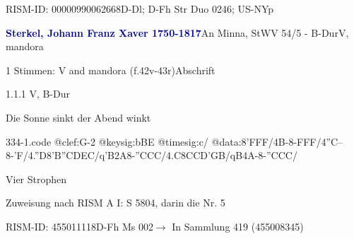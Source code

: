 \documentclass[twocolumn, 12pt]{book}
\begin{document}
\par RISM-ID: 00000990062668\newline D-Dl; D-Fh  Str Duo 0246; US-NYp
\par \vspace{16pt} \textcolor{darkblue}{\textbf{Sterkel, Johann Franz Xaver  1750-1817}}\hfillplus{\textbf{[334]}}\newline An Minna, StWV 54/5 - B-Dur\newline V, mandora
\par \begin{itshape}\end{itshape} 
\par \textcolor{darkblue}{}  1 Stimmen: V and mandora  (f.42v-43r)\newline Abschrift
\par 1.1.1  V, B-Dur\newline \begin{footnotesize} Die Sonne sinkt der Abend winkt \end{footnotesize}  
\begin{filecontents*}{334-1.code}
@clef:G-2
@keysig:bBE
@timesig:c/
@data:8'FFF/4B-8-FFF/4''C--8-'F/4.''D8'B{''CD}{EC}/q'B2A8-''CCC/4.C8C{CD}{'GB}/qB4A-8-''CCC/
\end{filecontents*}
\newline %
\par Vier Strophen
\par Zuweisung nach RISM A I: S 5804, darin die Nr. 5
\par RISM-ID: 455011118\newline D-Fh  Ms 002\newline $\rightarrow$ In Sammlung 419 (455008345)
      
\end{document}
